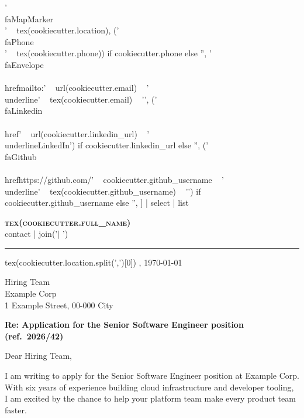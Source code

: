 \documentclass[{{ cookiecutter.paper_size }}paper,11pt]{article}
\begin{document}
{%
    '\\faMapMarker\\ ' ~ tex(cookiecutter.location),
    ('\\faPhone\\ ' ~ tex(cookiecutter.phone)) if cookiecutter.phone else '',
    '\\faEnvelope\\ \\href{mailto:' ~ url(cookiecutter.email) ~ '}{\\underline{' ~ tex(cookiecutter.email) ~ '}}',
    ('\\faLinkedin\\ \\href{' ~ url(cookiecutter.linkedin_url) ~ '}{\\underline{LinkedIn}}') if cookiecutter.linkedin_url else '',
    ('\\faGithub\\ \\href{https://github.com/' ~ cookiecutter.github_username ~ '}{\\underline{' ~ tex(cookiecutter.github_username) ~ '}}') if cookiecutter.github_username else '',
] | select | list %
\begin{center}
    \textbf{\Huge \scshape {{ tex(cookiecutter.full_name) }}} \\ \vspace{3pt}
    \small {{ contact | join('\n    $|$ ') }}
\end{center}
\vspace{-6pt}
\noindent\rule{\textwidth}{0.4pt}

\begin{flushright}
{{ tex(cookiecutter.location.split(',')[0]) }}, \today
\end{flushright}

Hiring Team\\
Example Corp\\
1 Example Street, 00-000 City

\textbf{Re: Application for the Senior Software Engineer position (ref.\ 2026/42)}

Dear Hiring Team,

I am writing to apply for the Senior Software Engineer position at Example Corp. With six years of experience building cloud infrastructure and developer tooling, I am excited by the chance to help your platform team make every product team faster.

}
\end{document}
